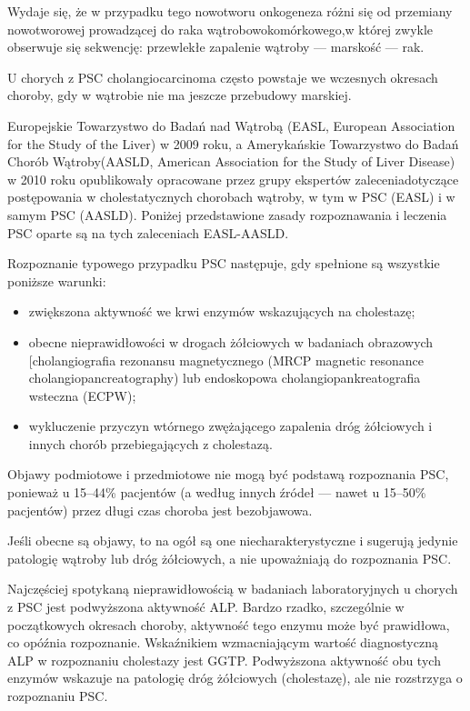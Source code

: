 Wydaje się, że w przypadku tego nowotworu onkogeneza różni się od przemiany nowotworowej prowadzącej  do  raka  wątrobowokomórkowego,w której zwykle obserwuje się sekwencję: przewlekłe zapalenie wątroby — marskość — rak.

U  chorych  z  PSC  cholangiocarcinoma  często powstaje we wczesnych okresach choroby, gdy w  wątrobie  nie  ma  jeszcze  przebudowy  marskiej.

Europejskie Towarzystwo do Badań nad Wątrobą (EASL, European Association for the Study of the Liver) w 2009 roku, a Amerykańskie Towarzystwo do Badań Chorób Wątroby(AASLD, American  Association  for  the  Study of  Liver  Disease)  w  2010  roku  opublikowały opracowane przez grupy ekspertów zaleceniadotyczące  postępowania  w  cholestatycznych chorobach wątroby, w tym w PSC (EASL) i w samym PSC (AASLD). 
Poniżej przedstawione zasady rozpoznawania i leczenia PSC oparte są na tych zaleceniach EASL-AASLD.

\vspace{0.5cm}

Rozpoznanie  typowego  przypadku PSC następuje,  gdy  spełnione  są  wszystkie  poniższe warunki:

\begin{itemize}
    \item zwiększona  aktywność  we  krwi  enzymów wskazujących  na  cholestazę;
    \item  obecne nieprawidłowości w drogach żółciowych w badaniach obrazowych [cholangiografia  rezonansu  magnetycznego  (MRCP magnetic  resonance  cholangiopancreatography) lub endoskopowa cholangiopankreatografia wsteczna (ECPW);
    \item  wykluczenie przyczyn wtórnego zwężającego zapalenia dróg żółciowych i innych chorób przebiegających z cholestazą.
\end{itemize}

Objawy podmiotowe i przedmiotowe nie mogą być podstawą rozpoznania PSC, ponieważ  u  15–44\%  pacjentów (a według innych źródeł — nawet u 15–50\% pacjentów) przez długi czas choroba jest bezobjawowa. 

Jeśli obecne są objawy, to na ogół są one niecharakterystyczne i sugerują jedynie patologię wątroby lub dróg żółciowych, a nie upoważniają do rozpoznania PSC.

Najczęściej spotykaną nieprawidłowością w badaniach laboratoryjnych u chorych z PSC jest  podwyższona  aktywność  ALP.  
Bardzo rzadko, szczególnie w początkowych okresach choroby,  aktywność  tego  enzymu  może  być prawidłowa, co opóźnia rozpoznanie. 
Wskaźnikiem wzmacniającym wartość diagnostyczną ALP  w  rozpoznaniu  cholestazy  jest GGTP.
Podwyższona  aktywność  obu  tych  enzymów wskazuje na patologię dróg żółciowych (cholestazę), ale nie rozstrzyga o rozpoznaniu PSC.

